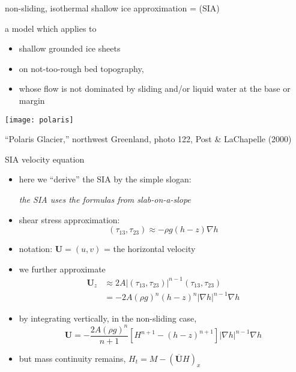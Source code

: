\begin{frame}{non-sliding, isothermal shallow ice approximation = (SIA)}

a model which applies to
\begin{itemize}
\item shallow grounded ice sheets
\item on not-too-rough bed topography,
\item whose flow is not dominated by sliding and/or liquid water at the base or margin
\end{itemize}

\begin{center}
  \texttt{[image: polaris]}

\tiny ``Polaris Glacier,'' northwest Greenland, photo 122, Post \& LaChapelle (2000)
\end{center}

\end{frame}


\begin{frame}{SIA velocity equation}

\begin{itemize}
\item \small here we ``derive'' the SIA by the simple slogan:\normalsize

\begin{center}
\emph{the SIA uses the formulas from slab-on-a-slope}
\end{center}
\item shear stress approximation:
	$$(\tau_{13},\tau_{23}) \approx - \rho g (h-z) \nabla h$$
\item notation: $\mathbf{U} = (u,v)$ = the horizontal velocity
\item we further approximate
\begin{align*}
\mathbf{U}_z &\approx 2 A |(\tau_{13},\tau_{23})|^{n-1} (\tau_{13},\tau_{23}) \\
     &= - 2 A (\rho g)^n (h-z)^n |\nabla h|^{n-1} \nabla h
\end{align*}
\item by integrating vertically, in the non-sliding case,
    $$\mathbf{U} = - \frac{2 A (\rho g)^n}{n+1} \left[H^{n+1} - (h-z)^{n+1}\right] |\nabla h|^{n-1} \nabla h$$
\item but mass continuity remains, $H_t = M - \left(\overline{\mathbf{U}} H\right)_x$
\end{itemize}
\end{frame}


